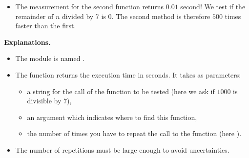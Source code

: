 \documentclass[11pt,class=report,crop=false]{standalone}
\begin{document}
\begin{cours}
\begin{itemize}
  \item The measurement for the second function returns $0.01$ second! We test if the remainder of $n$ divided by $7$ is $0$. The second method is therefore $500$ times faster than the first.
\end{itemize}  

\medskip

\textbf{Explanations.}
\begin{itemize}
  \item The module is named .
    
  \item The function  returns the execution time in seconds.
It takes as parameters: 
  \begin{itemize}
    \item a string for the call of the function to be tested (here we ask if $1000$ is divisible by $7$),
    \item an argument  which indicates where to find this function,
    \item the number of times you have to repeat the call to the function (here ).
  \end{itemize}
  \item The number of repetitions must be large enough to avoid uncertainties.
\end{itemize} 

\end{cours}


\end{document}
